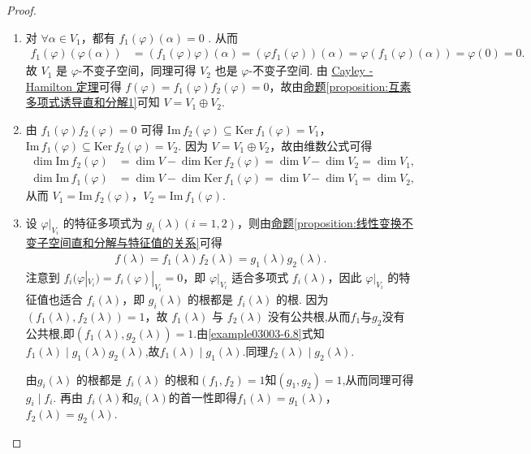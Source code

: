 \documentclass[../../main.tex]{subfiles}%
\begin{document}
\begin{proof}
\begin{enumerate}[(1)]
\item  对 $\forall \alpha\in V_1$，都有 $f_1(\varphi)(\alpha)=0$ . 从而
\begin{align*}
f_1(\varphi)(\varphi(\alpha))&=(f_1(\varphi)\varphi)(\alpha)=(\varphi f_1(\varphi))(\alpha)=\varphi(f_1(\varphi)(\alpha))=\varphi(0)=0.
\end{align*}
故 $V_1$ 是 $\varphi$-不变子空间，同理可得 $V_2$ 也是 $\varphi$-不变子空间. 
由 \hyperref[theorem:Cayley-Hamilton定理]{Cayley - Hamilton 定理}可得 $f(\varphi)=f_1(\varphi)f_2(\varphi)=0$，故由\hyperref[proposition:互素多项式诱导直和分解1]{命题\ref{proposition:互素多项式诱导直和分解1}}可知 $V = V_1\oplus V_2$.

\item 由 $f_1(\varphi)f_2(\varphi)=0$ 可得 $\mathrm{Im}\,f_2(\varphi)\subseteq\mathrm{Ker}\,f_1(\varphi)=V_1$，$\mathrm{Im}\,f_1(\varphi)\subseteq\mathrm{Ker}\,f_2(\varphi)=V_2$. 因为 $V = V_1\oplus V_2$，故由维数公式可得
\begin{align*}
\dim\mathrm{Im}\,f_2(\varphi)&=\dim V - \dim\mathrm{Ker}\,f_2(\varphi)=\dim V - \dim V_2=\dim V_1,\\
\dim\mathrm{Im}\,f_1(\varphi)&=\dim V - \dim\mathrm{Ker}\,f_1(\varphi)=\dim V - \dim V_1=\dim V_2,
\end{align*}
从而 $V_1 = \mathrm{Im}\,f_2(\varphi)$，$V_2 = \mathrm{Im}\,f_1(\varphi)$.

\item 设 $\varphi|_{V_i}$ 的特征多项式为 $g_i(\lambda) (i = 1,2)$，则由\hyperref[proposition:线性变换不变子空间直和分解与特征值的关系]{命题\ref{proposition:线性变换不变子空间直和分解与特征值的关系}}可得
\begin{align}
f(\lambda)=f_1(\lambda)f_2(\lambda)=g_1(\lambda)g_2(\lambda). \label{example03003-6.8}
\end{align}
注意到 $f_i(\varphi|_{V_i})=f_i(\varphi)|_{V_i}=0$，即 $\varphi|_{V_i}$ 适合多项式 $f_i(\lambda)$，因此 $\varphi|_{V_i}$ 的特征值也适合 $f_i(\lambda)$，即 $g_i(\lambda)$ 的根都是 $f_i(\lambda)$ 的根. 因为 $(f_1(\lambda),f_2(\lambda)) = 1$，故 $f_1(\lambda)$ 与 $f_2(\lambda)$ 没有公共根,从而$f_1$与$g_2$没有公共根,即$(f_1(\lambda),g_2(\lambda))=1.$由\eqref{example03003-6.8}式知$f_1(\lambda)\mid g_1(\lambda)g_2(\lambda)$,故$f_1(\lambda)\mid g_1(\lambda).$同理$f_2(\lambda)\mid g_2(\lambda).$

由$g_i(\lambda)$ 的根都是 $f_i(\lambda)$ 的根和$(f_1,f_2)=1$知$(g_1,g_2)=1$,从而同理可得$g_i\mid f_i$.
再由 $f_i(\lambda)$和$g_i(\lambda)$的首一性即得$f_1(\lambda)=g_1(\lambda)$，$f_2(\lambda)=g_2(\lambda)$. 
\end{enumerate}

\end{proof}
\end{document}
